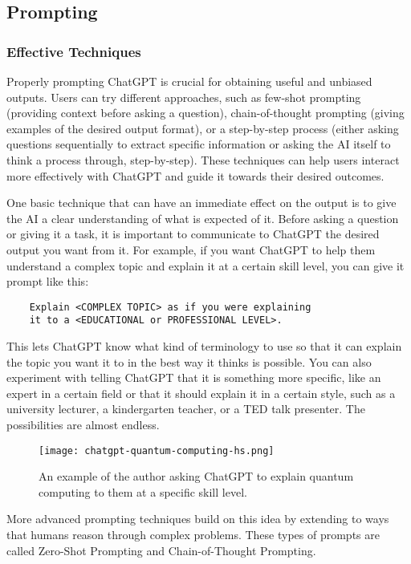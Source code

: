 \documentclass[12pt]{article}
\begin{document}
\subsection{Prompting} \label{sec:prompting}
\subsubsection{Effective Techniques}
Properly prompting ChatGPT is crucial for obtaining useful and unbiased outputs. Users can try different approaches, such as few-shot prompting (providing context before asking a question), chain-of-thought prompting (giving examples of the desired output format), or a step-by-step process (either asking questions sequentially to extract specific information or asking the AI itself to think a process through, step-by-step). These techniques can help users interact more effectively with ChatGPT and guide it towards their desired outcomes.

One basic technique that can have an immediate effect on the output is to give the AI a clear understanding of what is expected of it. Before asking a question or giving it a task, it is important to communicate to ChatGPT the desired output you want from it. For example, if you want ChatGPT to help them understand a complex topic and explain it at a certain skill level, you can give it prompt like this:

\begin{verbatim}
    Explain <COMPLEX TOPIC> as if you were explaining
    it to a <EDUCATIONAL or PROFESSIONAL LEVEL>.
\end{verbatim}

This lets ChatGPT know what kind of terminology to use so that it can explain the topic you want it to in the best way it thinks is possible. You can also experiment with telling ChatGPT that it is something more specific, like an expert in a certain field or that it should explain it in a certain style, such as a university lecturer, a kindergarten teacher, or a TED talk presenter. The possibilities are almost endless.

\begin{figure}[H]
  \centering
  \texttt{[image: chatgpt-quantum-computing-hs.png]}
  \caption{An example of the author asking ChatGPT to explain quantum computing to them at a specific skill level.}
  \label{fig:chatgpt fermat}
\end{figure}
 
More advanced prompting techniques build on this idea by extending to ways that humans reason through complex problems. These types of prompts are called Zero-Shot Prompting and Chain-of-Thought Prompting. 
\end{document}
